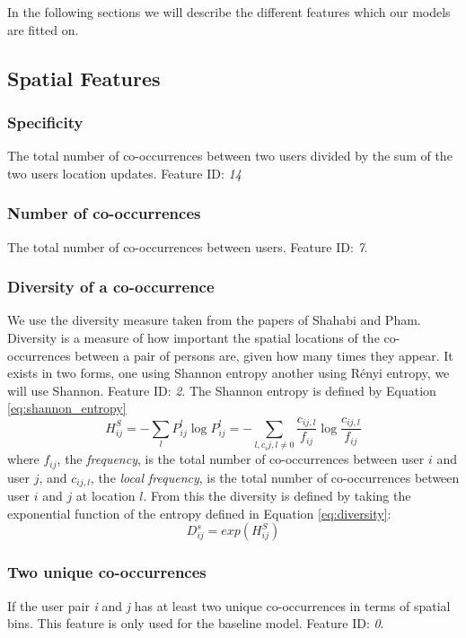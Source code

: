 In the following sections we will describe the different features which our models are fitted on.

\subsection{Spatial Features}

\subsubsection{Specificity}
The total number of co-occurrences between two users divided by the sum of the two users location updates. Feature ID: \textit{14}

\subsubsection{Number of co-occurrences}
The total number of co-occurrences between users. Feature ID: \textit{7}.

\subsubsection{Diversity of a co-occurrence}
We use the diversity measure taken from the papers of Shahabi and Pham\cite{iRWRfSD}\cite{AEBMtISSfSD}.
Diversity is a measure of how important the spatial locations of the co-occurrences between a pair of persons are, given how many times they appear.
It exists in two forms, one using Shannon entropy another using Rényi entropy, we will use Shannon. Feature ID: \textit{2}.
The Shannon entropy is defined by Equation \ref{eq:shannon_entropy}
\begin{equation}
\label{eq:shannon_entropy}
H^S_{ij}=-\sum\limits_{l}P^l_{ij} \log P^l_{ij}= -\sum\limits_{l,c_ij,l\neq 0}\frac{c_{ij,l}}{f_{ij}}\log \frac{c_{ij,l}}{f_{ij}}
\end{equation}
where $f_{ij}$, the \textit{frequency}, is the total number of co-occurrences between user $i$ and user $j$, and $c_{ij,l}$, the \textit{local frequency}, is the total number of co-occurrences between user $i$ and $j$ at location $l$.
From this the diversity is defined by taking the exponential function of the entropy defined in Equation \ref{eq:diversity}:
\begin{equation}
\label{eq:diversity}
D^s_{ij} = exp(H^S_{ij})
\end{equation}

\subsubsection{Two unique co-occurrences}
If the user pair \textit{i} and \textit{j} has at least two unique co-occurrences in terms of spatial bins. This feature is only used for the baseline model. Feature ID: \textit{0}.

